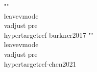{{{{{{{{{{{{{{{{{{{{{{{{{{{{""\\leavevmode\\vadjust pre{\\hypertarget{ref-burkner2017}{}}%
""\\leavevmode\\vadjust pre{\\hypertarget{ref-chen2021}{}}%
}}}}}}}}}}}}}}}}}}}}}}}}}}}}
